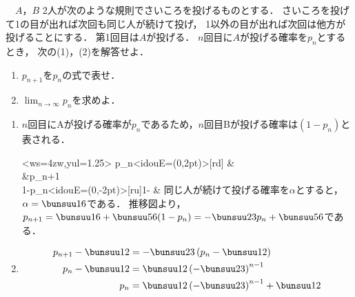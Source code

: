 \begin{problem}
　$A$，$B$ 2人が次のような規則でさいころを投げるものとする．
さいころを投げて1の目が出れば次回も同じ人が続けて投げ，
1以外の目が出れば次回は他方が投げることにする．
第1回目は$A$が投げる．
$n$回目に$A$が投げる確率を$p_n$とするとき，
次の(1)，(2)を解答せよ．
\begin{enumerate}
\item $p_{n+1}$を$p_n$の式で表せ．
\item $\displaystyle\lim_{n\to\infty}p_n$を求めよ．
\end{enumerate}
\end{problem}

\begin{enumerate}
  \item $n$回目にAが投げる確率が$p_n$であるため，$n$回目Bが投げる確率は$(1-p_n)$と表される．

  \EMxymatrix<ws=4zw,yul=1.25\baselineskip>{%
    p_n\ar<idouE={(0,2pt)}>[rd]{\alpha} & \\
    &p_{n+1} \\
    1-p_n\ar<idouE={(0,-2pt)}>[ru]{1-\alpha} &
  }
  同じ人が続けて投げる確率を$\alpha$とすると，$\alpha = \bunsuu16$である．
  推移図より，$p_{n+1} = \bunsuu16 + \bunsuu56(1-p_n) = -\bunsuu23p_n + \bunsuu56$である．

  \item
  \begin{align*}
    p_{n+1} - \bunsuu12 &= -\bunsuu23\left(p_n - \bunsuu12\right) \\
    p_n - \bunsuu12 &= \bunsuu12\left(-\bunsuu23\right)^{n-1}\\
    p_n &= \bunsuu12\left(-\bunsuu23\right)^{n-1} + \bunsuu12
  \end{align*}
\end{enumerate}
